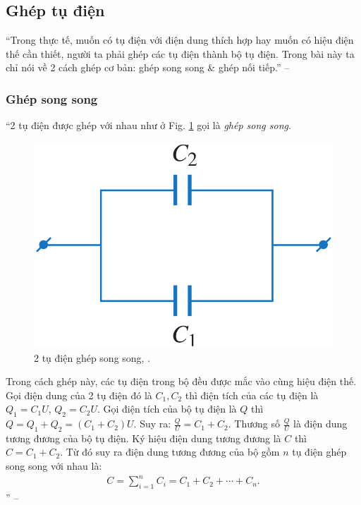 \documentclass[oneside]{book}
\numberwithin{equation}{section}
\begin{document}
\subsection{Ghép tụ điện}
``Trong thực tế, muốn có tụ điện với điện dung thích hợp hay muốn có hiệu điện thế cần thiết, người ta phải ghép các tụ điện thành bộ tụ điện. Trong bài này ta chỉ nói về 2 cách ghép cơ bản: ghép song song \& ghép nối tiếp.'' -- \cite[p. 34]{SGK_Vat_Ly_11_nang_cao}

\subsubsection{Ghép song song}
``2 tụ điện được ghép với nhau như ở Fig. \ref{fig:2_tu_dien_ghep_song_song} gọi là \textit{ghép song song}.

\begin{figure}[H]
	\centering
	\includegraphics[scale=0.15]{2_tu_dien_ghep_song_song}
	\caption{2 tụ điện ghép song song, \cite[Hình 7.5, p. 34]{SGK_Vat_Ly_11_nang_cao}.}
	\label{fig:2_tu_dien_ghep_song_song}
\end{figure}
Trong cách ghép này, các tụ điện trong bộ đều được mắc vào cùng hiệu điện thế. Gọi điện dung của 2 tụ điện đó là $C_1,C_2$ thì điện tích của các tụ điện là $Q_1 = C_1U$, $Q_2 = C_2U$. Gọi điện tích của bộ tụ điện là $Q$ thì $Q = Q_1 + Q_2 = (C_1 + C_2)U$. Suy ra: $\frac{Q}{U} = C_1 + C_2$. Thương số $\frac{Q}{U}$ là điện dung tương đương của bộ tụ điện. Ký hiệu điện dung tương đương là $C$ thì $C = C_1 + C_2$. Từ đó suy ra điện dung tương đương của bộ gồm $n$ tụ điện ghép song song với nhau là:
\begin{align}
	\label{dien dung tuong duong bo tu dien ghep song song}
	C = \sum_{i=1}^n C_i = C_1 + C_2 + \cdots + C_n.
\end{align}
'' -- \cite[pp. 34--35]{SGK_Vat_Ly_11_nang_cao}
\end{document}

